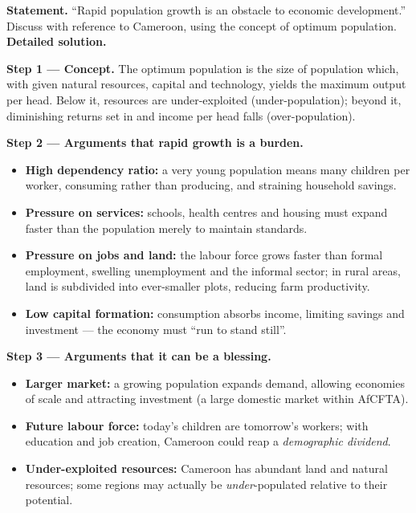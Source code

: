 \documentclass[11pt]{article}
\newcommand{\cle}[1]{{\popxbold\color{popdark}#1}}
\begin{document}
\begin{exoresolu}
\textbf{Statement.} ``Rapid population growth is an obstacle to economic development.'' Discuss with reference to Cameroon, using the concept of optimum population.
\tcblower
\textbf{Detailed solution.}

\textbf{Step 1 — Concept.} The \cle{optimum population} is the size of population which, with given natural resources, capital and technology, yields the maximum output per head. Below it, resources are under-exploited (under-population); beyond it, diminishing returns set in and income per head falls (over-population).

\textbf{Step 2 — Arguments that rapid growth is a burden.}
\begin{itemize}
\item \textbf{High dependency ratio:} a very young population means many children per worker, consuming rather than producing, and straining household savings.
\item \textbf{Pressure on services:} schools, health centres and housing must expand faster than the population merely to maintain standards.
\item \textbf{Pressure on jobs and land:} the labour force grows faster than formal employment, swelling unemployment and the informal sector; in rural areas, land is subdivided into ever-smaller plots, reducing farm productivity.
\item \textbf{Low capital formation:} consumption absorbs income, limiting savings and investment — the economy must ``run to stand still''.
\end{itemize}

\textbf{Step 3 — Arguments that it can be a blessing.}
\begin{itemize}
\item \textbf{Larger market:} a growing population expands demand, allowing economies of scale and attracting investment (a large domestic market within AfCFTA).
\item \textbf{Future labour force:} today's children are tomorrow's workers; with education and job creation, Cameroon could reap a \emph{demographic dividend}.
\item \textbf{Under-exploited resources:} Cameroon has abundant land and natural resources; some regions may actually be \emph{under}-populated relative to their potential.
\end{itemize}


\end{exoresolu}
\end{document}
